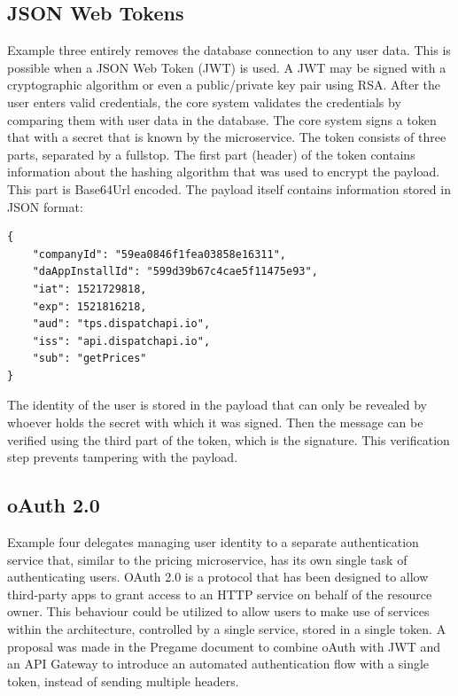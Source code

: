 \subsection{JSON Web Tokens}
Example three entirely removes the database connection to any user data. This is possible when a JSON Web Token (JWT) is used. A JWT may be signed with a cryptographic algorithm or even a public/private key pair using RSA. After the user enters valid credentials, the core system validates the credentials by comparing them with user data in the database. The core system signs a token that with a secret that is known by the microservice. The token consists of three parts, separated by a fullstop. The first part (header) of the token contains information about the hashing algorithm that was used to encrypt the payload. This part is Base64Url encoded. The payload itself contains information stored in JSON format:

\begin{Verbatim}[fontsize=\scriptsize]
{
	"companyId": "59ea0846f1fea03858e16311",
	"daAppInstallId": "599d39b67c4cae5f11475e93",
	"iat": 1521729818,
	"exp": 1521816218,
	"aud": "tps.dispatchapi.io",
	"iss": "api.dispatchapi.io",
	"sub": "getPrices"
}
\end{Verbatim}

The identity of the user is stored in the payload that can only be revealed by whoever holds the secret with which it was signed. Then the message can be verified using the third part of the token, which is the signature. This verification step prevents tampering with the payload.

\subsection{oAuth 2.0}
Example four delegates managing user identity to a separate authentication service that, similar to the pricing microservice, has its own single task of authenticating users. OAuth 2.0 is a protocol that has been designed to allow third-party apps to grant access to an HTTP service on behalf of the resource owner. This behaviour could be utilized to allow users to make use of services within the architecture, controlled by a single service, stored in a single token. A proposal was made in the Pregame document  to combine oAuth with JWT and an API Gateway to introduce an automated authentication flow with a single token, instead of sending multiple headers.

